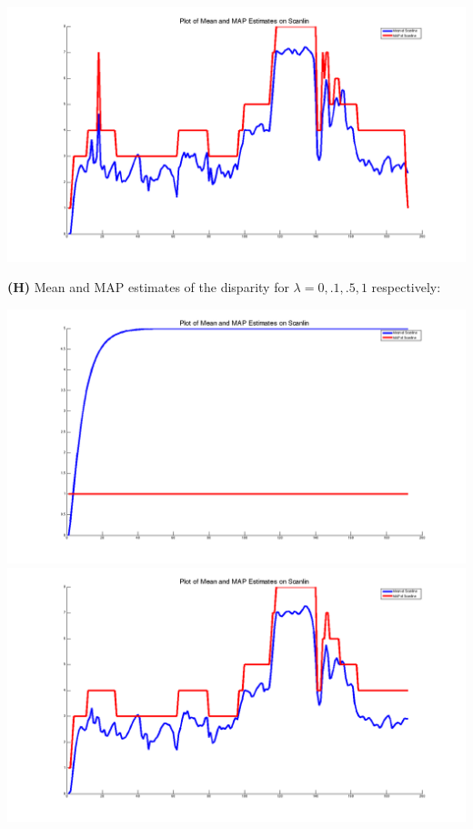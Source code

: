 \documentclass[12pt,twoside]{article}
\begin{document}
    \includegraphics[scale=.3]{5_1e}

\textbf{(H)} Mean and MAP estimates of the disparity for $\lambda = 0,.1,.5,1$ respectively:  
\newline 


	\hspace{-40pt}
    \includegraphics[scale=.18]{5_1lambda0_b}
    \includegraphics[scale=.18]{5_1lambda1_b} \newline
\end{document}
